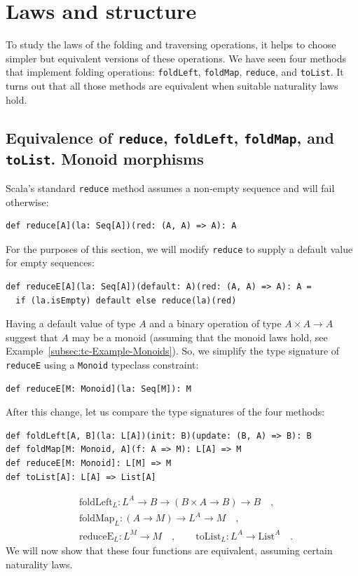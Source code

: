 \section{Laws and structure}

To study the laws of the folding and traversing operations, it helps
to choose simpler but equivalent versions of these operations. We
have seen four methods that implement folding operations: \lstinline!foldLeft!,
\lstinline!foldMap!, \lstinline!reduce!, and \lstinline!toList!.
It turns out that all those methods are equivalent when suitable naturality
laws hold.

\subsection{Equivalence of \texttt{reduce}, \texttt{foldLeft}, \texttt{foldMap},
and \texttt{toList}. Monoid morphisms\label{subsec:Equivalence-of-foldLeft,foldMap,reduce,and-toList}}

Scala\textsf{'}s standard \lstinline!reduce! method assumes a non-empty sequence
and will fail otherwise:
\begin{lstlisting}
def reduce[A](la: Seq[A])(red: (A, A) => A): A
\end{lstlisting}
For the purposes of this section, we will modify \lstinline!reduce!
to supply a default value for empty sequences:
\begin{lstlisting}
def reduceE[A](la: Seq[A])(default: A)(red: (A, A) => A): A =
  if (la.isEmpty) default else reduce(la)(red)
\end{lstlisting}
Having a default value of type $A$ and a binary operation of type
$A\times A\rightarrow A$ suggest that $A$ may be a monoid (assuming
that the monoid laws hold, see Example~\ref{subsec:tc-Example-Monoids}).
So, we simplify the type signature of \lstinline!reduceE! using a
\lstinline!Monoid! typeclass constraint:
\begin{lstlisting}
def reduceE[M: Monoid](la: Seq[M]): M
\end{lstlisting}

After this change, let us compare the type signatures of the four
methods:
\begin{lstlisting}
def foldLeft[A, B](la: L[A])(init: B)(update: (B, A) => B): B
def foldMap[M: Monoid, A](f: A => M): L[A] => M
def reduceE[M: Monoid]: L[M] => M
def toList[A]: L[A] => List[A]
\end{lstlisting}
\begin{align*}
 & \text{foldLeft}_{L}:L^{A}\rightarrow B\rightarrow(B\times A\rightarrow B)\rightarrow B\quad,\\
 & \text{foldMap}_{L}:(A\rightarrow M)\rightarrow L^{A}\rightarrow M\quad,\\
 & \text{reduceE}_{L}:L^{M}\rightarrow M\quad,\quad\quad\text{toList}_{L}:L^{A}\rightarrow\text{List}^{A}\quad.
\end{align*}
We will now show that these four functions are equivalent, assuming
certain naturality laws.

